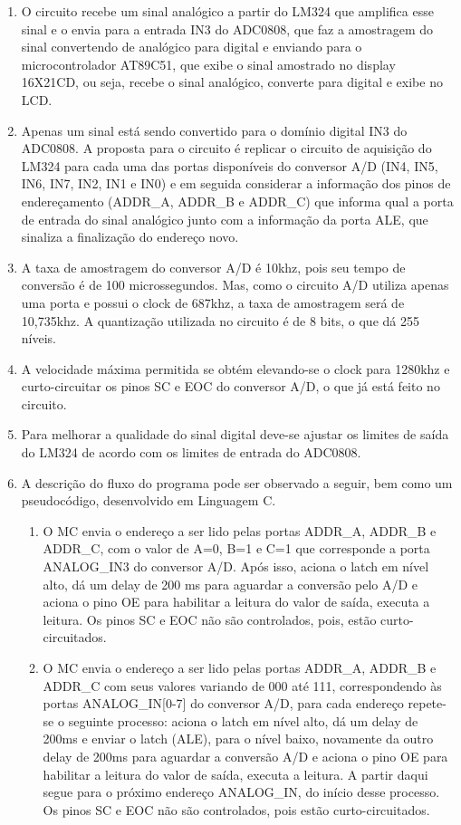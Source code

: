 \documentclass[
	12pt,				%
	openright,			%
  oneside,     %
	a4paper,			%
	english,			%
	french,				%
	spanish,			%
	brazil				%
	]{abntex2}
\begin{document}
\begin{enumerate}
  \item O circuito recebe um sinal analógico a partir do LM324 que amplifica esse sinal e o envia para a entrada IN3 do ADC0808, que faz a amostragem do sinal convertendo de analógico para digital e enviando para o microcontrolador AT89C51, que exibe o sinal amostrado no display 16X21CD, ou seja, recebe o sinal analógico, converte para digital e exibe no LCD.
  \item Apenas um sinal está sendo convertido para o domínio digital IN3 do ADC0808. A proposta para o circuito é replicar o circuito de aquisição do LM324 para cada uma das portas disponíveis do conversor A/D (IN4, IN5, IN6, IN7, IN2, IN1 e IN0) e em seguida considerar a informação dos pinos de endereçamento (ADDR\_A, ADDR\_B e ADDR\_C) que informa qual a porta de entrada do sinal analógico junto com a informação da porta ALE, que sinaliza a finalização do endereço novo.
  \item A taxa de amostragem do conversor A/D é 10khz, pois seu tempo de conversão é de 100 microssegundos. Mas, como o circuito A/D utiliza apenas uma porta e possui o clock de 687khz, a taxa de amostragem será de 10,735khz. A quantização utilizada no circuito é de 8 bits, o que dá 255 níveis.
  \item A velocidade máxima permitida se obtém elevando-se o clock para 1280khz e curto-circuitar os pinos SC e EOC do conversor A/D, o que já está feito no circuito.
  \item Para melhorar a qualidade do sinal digital deve-se ajustar os limites de saída do LM324 de acordo com os limites de entrada do ADC0808.
  \item A descrição do fluxo do programa pode ser observado a seguir, bem como um pseudocódigo, desenvolvido em Linguagem C.
  \begin{enumerate}
    \item O MC envia o endereço a ser lido pelas portas  ADDR\_A, ADDR\_B e ADDR\_C, com o valor de A=0, B=1 e C=1 que corresponde a porta ANALOG\_IN3 do conversor A/D. Após isso, aciona o latch em nível alto, dá um delay de 200 ms  para aguardar a conversão pelo A/D e aciona o pino OE para habilitar a leitura do valor de saída, executa a leitura. Os pinos SC e EOC não são controlados, pois, estão curto-circuitados.
    \item O MC envia o endereço a ser lido pelas portas ADDR\_A, ADDR\_B e ADDR\_C com seus valores variando de 000 até 111, correspondendo às portas ANALOG\_IN[0-7] do conversor A/D, para cada endereço repete-se o seguinte processo: aciona o latch em nível alto, dá um delay de 200ms e enviar o latch  (ALE), para o nível baixo, novamente da outro delay de 200ms para aguardar a conversão A/D e aciona o pino OE para habilitar a leitura do valor de saída, executa a leitura. A partir daqui segue para o próximo endereço ANALOG\_IN, do início desse processo. Os pinos SC e EOC não são controlados, pois estão curto-circuitados. 
  \end{enumerate}
\end{enumerate}
\end{document}
